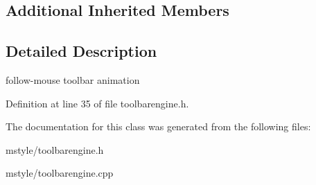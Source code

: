 \subsection*{Additional Inherited Members}


\subsection{Detailed Description}
follow-\/mouse toolbar animation 

Definition at line 35 of file toolbarengine.\+h.



The documentation for this class was generated from the following files\+:\begin{DoxyCompactItemize}
\item 
mstyle/toolbarengine.\+h\item 
mstyle/toolbarengine.\+cpp\end{DoxyCompactItemize}
